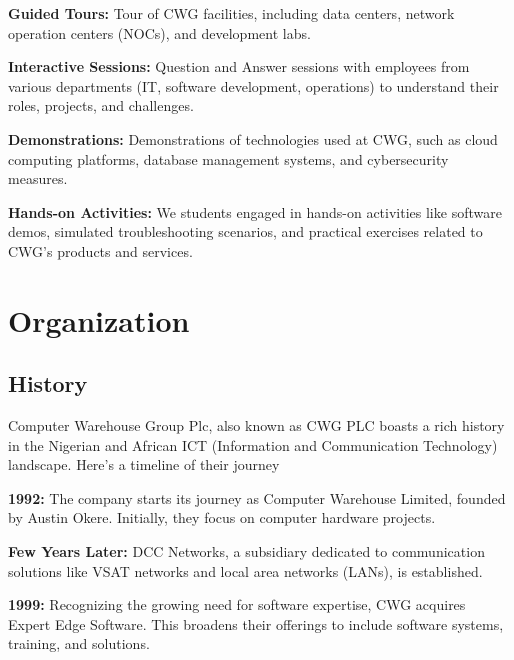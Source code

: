 \documentclass[a4paper,12pt]{report}
\begin{document}
	\textbf{Guided Tours:} Tour of CWG facilities, including data centers, network operation centers (NOCs), and development labs. 
	
	\vspace{\baselineskip}
	
	\textbf{Interactive Sessions:} Question and Answer sessions with employees from various departments (IT, software development, operations) to understand their roles, projects, and challenges.
	
	\vspace{\baselineskip}
	
	\textbf{Demonstrations:} Demonstrations of technologies used at CWG, such as cloud computing platforms, database management systems, and cybersecurity measures.
	
	\vspace{\baselineskip}
	
	\textbf{Hands-on Activities:}  We students engaged in hands-on activities like software demos, simulated troubleshooting scenarios, and practical exercises related to CWG's products and services.
	
	\chapter{Organization}
	
	\section{History}
	Computer Warehouse Group Plc, also known as CWG PLC boasts a rich history in the Nigerian and African ICT (Information and Communication Technology) landscape. Here's a timeline of their journey
	
	\vspace{\baselineskip}
	
	\textbf{1992:} The company starts its journey as Computer Warehouse Limited, founded by Austin Okere. Initially, they focus on computer hardware projects.
	
	\vspace{\baselineskip}
	
	\textbf{Few Years Later:} DCC Networks, a subsidiary dedicated to communication solutions like VSAT networks and local area networks (LANs), is established.
	
	\vspace{\baselineskip}
	
	\textbf{1999:} Recognizing the growing need for software expertise, CWG acquires Expert Edge Software. This broadens their offerings to include software systems, training, and solutions.
	
\end{document}
